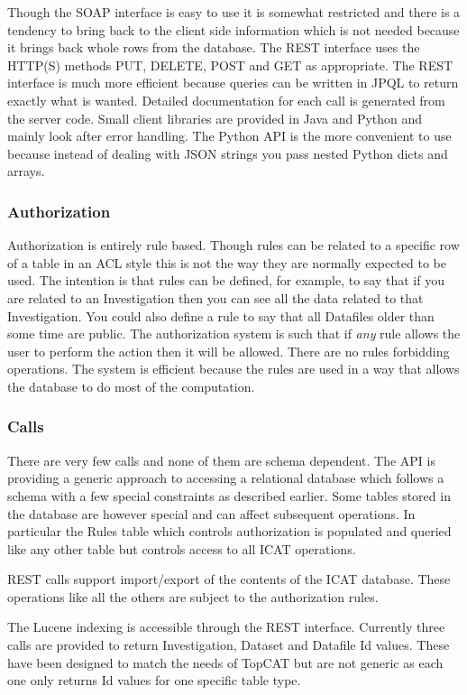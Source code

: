 \documentclass[a4paper]{jpconf}
\begin{document}
Though the SOAP interface is easy to use it is somewhat restricted and
there is a tendency to bring back to the client side information which
is not needed because it brings back whole rows from the database. The
REST interface uses the HTTP(S) methods PUT, DELETE, POST and GET as
appropriate. The REST interface is much more efficient because queries
can be written in JPQL to return exactly what is wanted. Detailed
documentation for each call is generated from the server code.  Small
client libraries are provided in Java and Python and mainly look after
error handling.  The Python API is the more convenient to use because
instead of dealing with JSON strings you pass nested Python dicts and
arrays.

\subsubsection{Authorization}
Authorization is entirely rule based. Though rules can be related to a
specific row of a table in an ACL style this is not the way they are
normally expected to be used. The intention is that rules can be
defined, for example, to say that if you are related to an
Investigation then you can see all the data related to that
Investigation. You could also define a rule to say that all Datafiles
older than some time are public. The authorization system is such that
if \emph{any} rule allows the user to perform the action then it will
be allowed. There are no rules forbidding operations. The system is
efficient because the rules are used in a way that allows the database
to do most of the computation.

\subsubsection{Calls}
There are very few calls and none of them are schema dependent. The
API is providing a generic approach to accessing a relational database
which follows a schema with a few special constraints as described
earlier. Some tables stored in the database are however special and
can affect subsequent operations. In particular the Rules table which
controls authorization is populated and queried like any other table
but controls access to all ICAT operations.

REST calls support import/export of the contents of the ICAT
database. These operations like all the others are subject to the
authorization rules.

The Lucene indexing is accessible through the REST interface. Currently
three calls are provided to return Investigation, Dataset and Datafile
Id values. These have been designed to match the needs of TopCAT but
are not generic as each one only returns Id values for one specific
table type.
\end{document}
